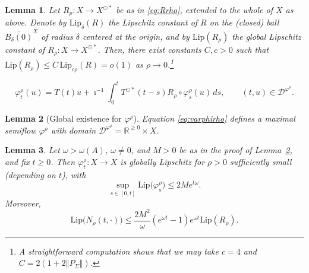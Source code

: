 \documentclass[10pt,a4paper]{amsart}
\newtheorem{lemma}{Lemma}
\newcommand{\lip}{\mathrm{Lip}}
\begin{document}
\begin{lemma} \label{lemma:Lipschitz}
    Let $R_\rho :X \to X^{\odot *}$ be as in \eqref{eq:Rrho}, extended to the whole of $X$ as above.
    Denote by $\lip_\delta(R)$ the Lipschitz constant of $R$ on the (closed) ball $\overline{B_\delta(0)}^X$ of radius $\delta$ centered at the origin, and by $\lip(R_\rho)$ the global Lipschitz constant of $R_\rho:X \to X^{\odot *} $.
    Then, there exist  constants $C,c >0 $ such that $\lip(R_\rho) \leq  C \, \lip_{c \rho}(R) = o(1)$ as $\rho \to 0$.\footnote{A straightforward computation shows that we may take $c = 4$ and $C = 2(1+2\Vert P_\Sigma \Vert)$.}
\end{lemma}

\begin{equation}
    \varphi_t^\rho(u) = T(t) u + \imath^{-1} \int_0^t T^{\odot *} (t-s) R_\rho \circ \varphi_s^\rho(u) \, ds,  \qquad (t,u) \in \mathcal{D}^{\varphi^\rho}.
    \label{eq:varphirho}
\end{equation}

\begin{lemma}[Global existence for $\varphi^\rho$] \label{lemma:globalexist}
    Equation \eqref{eq:varphirho} defines a maximal semiflow $\varphi^\rho$ with domain $\mathcal{D}^{\varphi^\rho} = \mathbb{R}^{\geq 0} \times X$.
\end{lemma}

\begin{lemma} \label{lemma:nonlinearity_sf}
    Let $\omega > \omega(A)$, $\omega \neq 0$, and $M>0$ be as in the proof of Lemma~\ref{lemma:globalexist}, and fix $t \geq 0$.
    Then $\varphi_t^\rho : X \to X$ is globally Lipschitz for $\rho > 0$ sufficiently small (depending on $t$), with
    \begin{displaymath}
       \sup_{s \in [0,t]} \lip\big( \varphi_s^\rho\big) \leq 2M e^{t \omega}.
    \end{displaymath}
    Moreover,
    \begin{equation}
         \lip\big(N_\rho(t,\cdot)\big) \leq \frac{2M^2}{\omega} \left( e^{\omega t} - 1 \right)  e^{\omega t} \lip(R_\rho).
         \label{eq:LipN}
    \end{equation}
\end{lemma}
\end{document}
